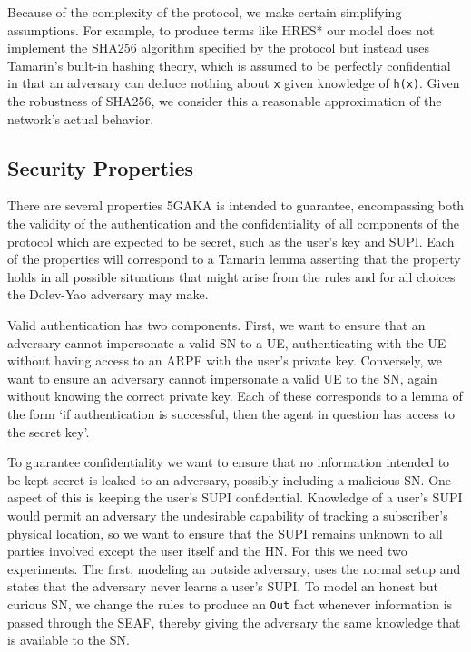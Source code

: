 \documentclass[10pt, pdftex]{article}
\begin{document}
Because of the complexity of the protocol, we make certain simplifying assumptions. For example, to produce terms like HRES* our model does not implement the SHA256 algorithm specified by the protocol but instead uses Tamarin's built-in hashing theory, which is assumed to be perfectly confidential in that an adversary can deduce nothing about \verb|x| given knowledge of \verb|h(x)|. Given the robustness of SHA256, we consider this a reasonable approximation of the network's actual behavior.

\subsection{Security Properties}

There are several properties 5GAKA is intended to guarantee, encompassing both the validity of the authentication and the confidentiality of all components of the protocol which are expected to be secret, such as the user's key and SUPI. Each of the properties will correspond to a Tamarin lemma asserting that the property holds in all possible situations that might arise from the rules and for all choices the Dolev-Yao adversary may make.

Valid authentication has two components. First, we want to ensure that an adversary cannot impersonate a valid SN to a UE, authenticating with the UE without having access to an ARPF with the user's private key. Conversely, we want to ensure an adversary cannot impersonate a valid UE to the SN, again without knowing the correct private key. Each of these corresponds to a lemma of the form `if authentication is successful, then the agent in question has access to the secret key'.

To guarantee confidentiality we want to ensure that no information intended to be kept secret is leaked to an adversary, possibly including a malicious SN. One aspect of this is keeping the user's SUPI confidential. Knowledge of a user's SUPI would permit an adversary the undesirable capability of tracking a subscriber's physical location, so we want to ensure that the SUPI remains unknown to all parties involved except the user itself and the HN. For this we need two experiments. The first, modeling an outside adversary, uses the normal setup and states that the adversary never learns a user's SUPI. To model an honest but curious SN, we change the rules to produce an \verb|Out| fact whenever information is passed through the SEAF, thereby giving the adversary the same knowledge that is available to the SN.
\end{document}
